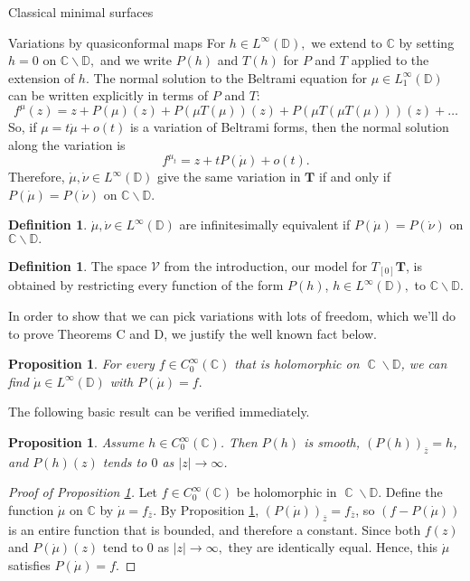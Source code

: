 \documentclass[10pt]{amsart}
\newtheorem{prop}[thm]{Proposition}
\DeclareMathOperator{\C}{\mathbb{C}}
\theoremstyle{definition}
\newtheorem{defn}[thm]{Definition}
\begin{document}
\begin{section}{Classical minimal surfaces}
\begin{subsection}{Variations by quasiconformal maps}
For $h\in L^\infty(\mathbb{D}),$ we extend to $\mathbb{C}$ by setting $h=0$ on $\mathbb{C}\backslash\mathbb{D},$ and we write $P(h)$ and $T(h)$ for $P$ and $T$ applied to the extension of $h$.
The normal solution to the Beltrami equation for $\mu\in L_1^\infty(\mathbb{D})$ can be written explicitly in terms of $P$ and $T$:
 $$f^\mu(z) = z+P(\mu)(z)+P(\mu T(\mu))(z) + P(\mu T(\mu T(\mu)))(z)+\dots$$
 So, if $\mu=t\dot{\mu}+o(t)$ is a variation of Beltrami forms, then the normal solution along the variation is $$f^{\mu_t}= z + tP(\dot{\mu})+o(t).$$ Therefore, $\dot{\mu},\dot{\nu}\in L^\infty(\mathbb{D})$ give the same variation in $\mathbf{T}$ if and only if $P(\dot{\mu})=P(\dot{\nu})$ on $\mathbb{C}\backslash\mathbb{D}.$
 \begin{defn}
     $\dot{\mu},\dot{\nu}\in L^\infty(\mathbb{D})$ are infinitesimally equivalent if $P(\dot{\mu})=P(\dot{\nu})$ on $\mathbb{C}\backslash\mathbb{D}.$
 \end{defn}
\begin{defn}
    The space $\mathcal{V}$ from the introduction, our model for $T_{[0]}\mathbf{T}$, is obtained by restricting every function of the form $P(h)$, $h\in L^\infty(\mathbb{D}),$ to $\mathbb{C}\backslash\mathbb{D}$.
\end{defn}
 In order to show that we can pick variations with lots of freedom, which we'll do to prove Theorems C and D, we justify the well known fact below.
 \begin{prop}\label{choose}
     For every $f\in C_0^\infty(\mathbb{C})$ that is holomorphic on $\C\backslash\mathbb{D}$, we can find $\dot{\mu}\in L^\infty(\mathbb{D})$ with $P(\dot{\mu})=f.$
 \end{prop}
The following basic result can be verified immediately.
\begin{prop}\label{Cauchyprop}
Assume $h\in C_0^\infty(\mathbb{C})$. Then $P(h)$ is smooth, $(P(h))_{\overline{z}}=h$, and $P(h)(z)$ tends to $0$ as $|z|\to \infty$. 
\end{prop}
\begin{proof}[Proof of Proposition \ref{choose}]
    Let $f\in C_0^\infty(\mathbb{C})$ be holomorphic in $\C\backslash\mathbb{D}$. Define the function $\dot{\mu}$ on $\mathbb{C}$ by $\dot{\mu}=f_{\overline{z}}.$ By Proposition \ref{Cauchyprop}, $(P(\dot{\mu}))_{\overline{z}}=f_{\overline{z}}$, so $(f-P(\dot{\mu}))$ is an entire function that is bounded, and therefore a constant. Since both $f(z)$ and $P(\dot{\mu})(z)$ tend to $0$ as $|z|\to \infty,$ they are identically equal. Hence, this $\dot{\mu}$ satisfies $P(\dot{\mu}) = f$.

\end{proof}
\end{subsection}
\end{section}
\end{document}
